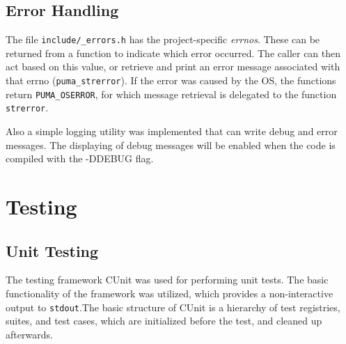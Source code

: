 \documentclass[12pt,a4paper]{article}
\begin{document}
\subsection{Error Handling}

The file \texttt{include/\_errors.h} has the project-specific \emph{errnos}. These can be returned from a function to indicate which error occurred. The caller can then act based on this value, or retrieve and print an error message associated with that errno (\texttt{puma\_strerror}). If the error was caused by the OS, the functions return \texttt{PUMA\_OSERROR}, for which message retrieval is delegated to the function \texttt{strerror}.

Also a simple logging utility was implemented that can write debug and error messages. The displaying of debug messages will be enabled when the code is compiled with the -DDEBUG flag.






\section{Testing}

\subsection{Unit Testing}


The testing framework CUnit was used for performing unit tests. The basic functionality of the framework was utilized, which provides a non-interactive output to \texttt{stdout}.The basic structure of CUnit is a hierarchy of test registries, suites, and test cases, which are initialized before the test, and cleaned up afterwards.
\end{document}
